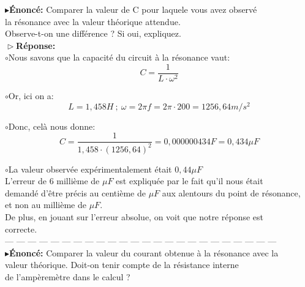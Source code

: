 \documentclass{report}
\begin{document}
\pagebreak

\textbf{$\blacktriangleright$\'Enonc\'e:} Comparer la valeur de C pour laquele vous avez observ\'e \\
\hspace*{2,35cm}la r\'esonance avec la valeur th\'eorique attendue. \\
\hspace*{2,35cm}Observe-t-on une diff\'erence ? Si oui, expliquez. \\ 

\textbf{$\vartriangleright$R\'eponse:} ~~\\ 

$\circ$Nous savons que la capacit\'e du circuit \`a la r\'esonance vaut:
$$ C = \frac{1}{L \cdot \omega^{2}} $$ 

$\circ$Or, ici on a:
$$ L = 1,458H\ ;\ \omega = 2\pi f = 2\pi \cdot 200 = 1256,64m/s^{2} $$

$\circ$Donc, cel\`a nous donne:
$$ C = \frac{1}{1,458 \cdot (1256,64)^{2}} = 0,000000434F = 0,434\mu F $$

$\circ$La valeur observ\'ee exp\'erimentalement \'etait $0,44\mu F$\\
\hspace*{0.75cm}L'erreur de 6 milli\`eme de $\mu F$ est expliqu\'ee par le fait qu'il nous \'etait \\ 
\hspace*{0.75cm}demand\'e d'\^etre pr\'ecis au centi\`eme de $\mu F$ aux alentours du point de r\'esonance, \\
\hspace*{0.75cm}et non au milli\`eme de $\mu F$. \\
\hspace*{0.75cm}De plus, en jouant sur l'erreur absolue, on voit que notre r\'eponse est \\
\hspace*{0.75cm}correcte.
~~\\

--- --- --- --- --- --- --- --- --- --- --- --- --- --- --- --- --- --- --- --- --- --- --- --- \\

\textbf{$\blacktriangleright$\'Enonc\'e:} Comparer la valeur du courant obtenue \`a la r\'esonance avec la \\
\hspace*{2,35cm}valeur th\'eorique. Doit-on tenir compte de la r\'esistance interne \\
\hspace*{2,35cm}de l'amp\`erem\`etre dans le calcul ? \\ 
\end{document}
